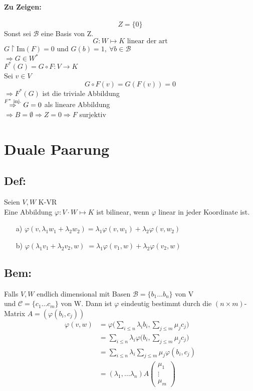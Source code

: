 \documentclass[titlepage,12pt,a4paper,ngerman]{report}
\newcommand{\tx}[1]{\textrm{#1}}
\begin{document}
\paragraph{Zu Zeigen:} $$Z = \{0\} $$
Sonst sei $\mathcal B$ eine Basis von Z. 
$$G: W \mapsto K \tx{ linear der art}$$
$G \upharpoonright$Im$(F) = 0$ und $G(b) = 1,\ \forall b \in \mathcal B$\\
$ \Rightarrow G \in W^* $\\
$ F^*(G) = G \circ F : V \to K $\\
Sei $ v \in V $
$$ G \circ F(v) = G(F(v)) = 0 $$
$\Rightarrow F^*(G) $ ist die triviale Abbildung\\
$ \buildrel F^* \tx{ inj.} \over \Rightarrow G =0 $ als lineare Abbildung\\
$ \Rightarrow B = \emptyset \Rightarrow Z = 0 \Rightarrow F $ surjektiv

\section{Duale Paarung}
\subsection{Def:}
Seien $ V,W $ K-VR\\
Eine Abbildung $ \varphi: V \cdot W \mapsto K $ ist bilinear, wenn $ \varphi $ linear in jeder Koordinate ist.
\begin{itemize}
	\item[a)] $ \varphi(v, \lambda_1w_1 + \lambda_2 w_2) = \lambda_1 \varphi(v, w_1) + \lambda_2 \varphi(v,w_2) $
	\item[b)] $ \varphi(\lambda_1 v_1 + \lambda_2 v_2, w) \;= \lambda_1 \varphi(v_1,w) + \lambda_2 \varphi(v_2,w) $
\end{itemize}

\subsection*{Bem:} Falls $V, W$ endlich dimensional mit Basen $\mathcal B = \{b_1 \dots b_n\}$ von V\\
und $\mathcal C = \{c_1 \dots c_m\}$ von W. Dann ist $\varphi$ eindeutig bestimmt durch die $(n \times m)$-Matrix $A= (\varphi(b_i, c_j))$
\begin{align*}
\varphi(v, w) &= \varphi \bigg(\sum_{i \leq n} \lambda_i b_i, \sum_{j \leq m}\mu_j c_j\bigg)\\
&= \sum_{i \leq n} \lambda_i \varphi \bigg(b_i, \sum_{j \leq m} \mu_j c_j \bigg)\\
&= \sum_{i \leq n} \lambda_i \sum_{j \leq m} \mu_j \varphi(b_i, c_j)\\
&= (\lambda_1, \dots \lambda_n)A \begin{pmatrix}
\mu_1 \\ \vdots \\ \mu_m
\end{pmatrix}
\end{align*}
\end{document}
